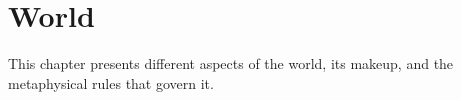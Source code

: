 \chapter{World}
This chapter presents different aspects of the world, its makeup, and the metaphysical rules that govern it.



